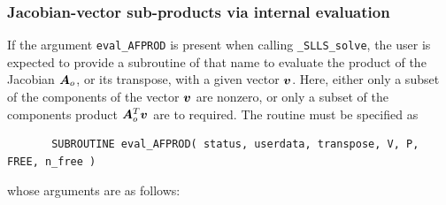\documentclass{galahad}
\newcommand{\packagename}{SLLS}
\newcommand{\fullpackagename}{\libraryname\_\packagename}
\newcommand{\solver}{{\tt \fullpackagename\_solve}}
\begin{document}
\subsubsection{Jacobian-vector sub-products via internal evaluation\label{jvsp}}

If the argument {\tt eval\_AFPROD} is present when calling \solver, the
user is expected to provide a subroutine of that name to evaluate the
product of the Jacobian ${\bm{A}}_o$, or its transpose, with a given vector ${\bm{v}}$.
Here, either only a subset of the components of the vector ${\bm{v}}$ are nonzero,
or only a subset of the components product ${\bm{A}}_o^T {\bm{v}}$ are to required.
The routine must be specified as

\def\baselinestretch{0.8}
{\tt \begin{verbatim}
       SUBROUTINE eval_AFPROD( status, userdata, transpose, V, P, FREE, n_free )
\end{verbatim} }
\def\baselinestretch{1.0}
\noindent whose arguments are as follows:
\end{document}
